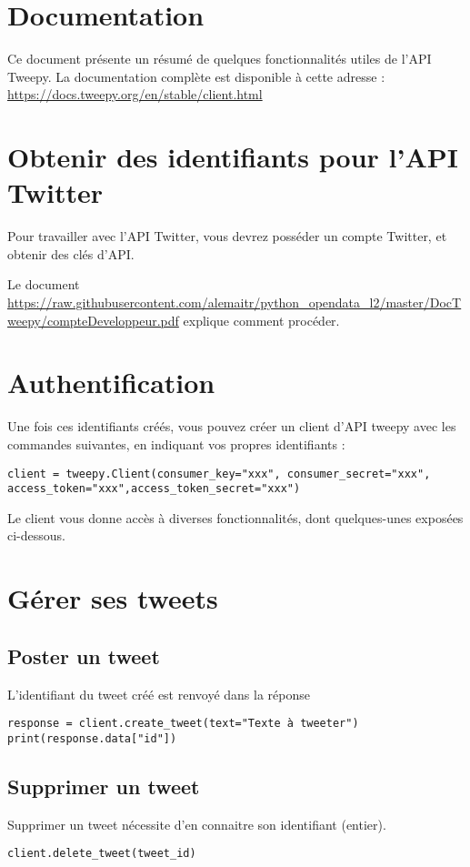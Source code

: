 \documentclass[11pt,a4paper]{article}
\begin{document}
\section*{Documentation}
Ce document présente un résumé de quelques fonctionnalités utiles de l'API Tweepy. La documentation complète est disponible à cette adresse : \url{https://docs.tweepy.org/en/stable/client.html}

\section{Obtenir des identifiants pour l'API Twitter}
Pour travailler avec l’API Twitter, vous devrez posséder un compte Twitter, et obtenir des clés d'API.

Le document \url{https://raw.githubusercontent.com/alemaitr/python_opendata_l2/master/DocTweepy/compteDeveloppeur.pdf} explique comment procéder. 

\section{Authentification}
Une fois ces identifiants créés, vous pouvez créer un client d'API tweepy avec les commandes suivantes, en indiquant vos propres identifiants  :
\begin{lstlisting}
client = tweepy.Client(consumer_key="xxx", consumer_secret="xxx", access_token="xxx",access_token_secret="xxx")
\end{lstlisting}
Le client vous donne accès à diverses fonctionnalités, dont quelques-unes  exposées ci-dessous. 
\section{Gérer ses tweets}
\subsection{Poster un tweet}

L'identifiant du tweet créé est renvoyé dans la réponse
\begin{lstlisting}
response = client.create_tweet(text="Texte à tweeter")
print(response.data["id"])
\end{lstlisting}

\subsection{Supprimer un tweet}
Supprimer un tweet nécessite d'en connaitre son identifiant (entier).
\begin{lstlisting}
client.delete_tweet(tweet_id)
\end{lstlisting}
\end{document}
